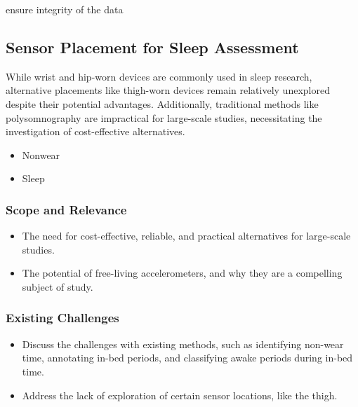 \documentclass[
  9pt,
]{scrbook}
\providecommand{\tightlist}{%
  \setlength{\itemsep}{0pt}\setlength{\parskip}{0pt}}\usepackage{longtable,booktabs,array}
\begin{document}
ensure integrity of the data

\hypertarget{sensor-placement-for-sleep-assessment}{%
\subsection{Sensor Placement for Sleep
Assessment}\label{sensor-placement-for-sleep-assessment}}

While wrist and hip-worn devices are commonly used in sleep research,
alternative placements like thigh-worn devices remain relatively
unexplored despite their potential advantages. Additionally, traditional
methods like polysomnography are impractical for large-scale studies,
necessitating the investigation of cost-effective alternatives.

\begin{itemize}
\tightlist
\item
  Nonwear
\item
  Sleep
\end{itemize}

\hypertarget{scope-and-relevance}{%
\subsubsection{Scope and Relevance}\label{scope-and-relevance}}

\begin{itemize}
\tightlist
\item
  The need for cost-effective, reliable, and practical alternatives for
  large-scale studies.
\item
  The potential of free-living accelerometers, and why they are a
  compelling subject of study.
\end{itemize}

\hypertarget{existing-challenges}{%
\subsubsection{Existing Challenges}\label{existing-challenges}}

\begin{itemize}
\tightlist
\item
  Discuss the challenges with existing methods, such as identifying
  non-wear time, annotating in-bed periods, and classifying awake
  periods during in-bed time.
\item
  Address the lack of exploration of certain sensor locations, like the
  thigh.
\end{itemize}
\end{document}
